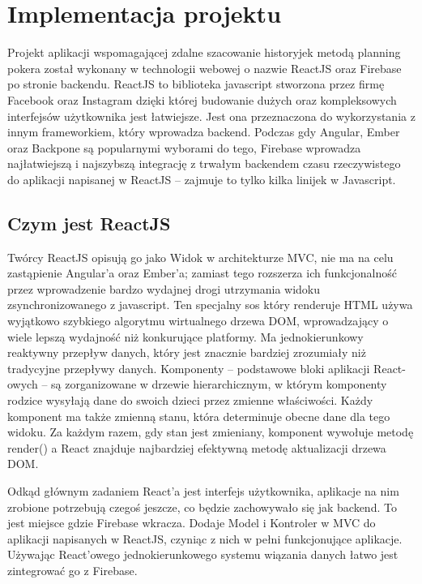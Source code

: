 
\chapter{Implementacja projektu}

Projekt aplikacji wspomagającej zdalne szacowanie historyjek metodą planning pokera został wykonany w technologii webowej o nazwie ReactJS oraz Firebase po stronie backendu. ReactJS to biblioteka javascript stworzona przez firmę Facebook oraz Instagram dzięki której budowanie dużych oraz kompleksowych interfejsów użytkownika jest łatwiejsze. Jest ona przeznaczona do wykorzystania z innym frameworkiem, który wprowadza backend. Podczas gdy Angular, Ember oraz Backpone są popularnymi wyborami do tego, Firebase wprowadza najłatwiejszą i najszybszą integrację z trwałym backendem czasu rzeczywistego do aplikacji napisanej w ReactJS – zajmuje to tylko kilka linijek w Javascript. 

\section{Czym jest ReactJS}

Twórcy ReactJS opisują go jako Widok w architekturze MVC, nie ma na celu zastąpienie Angular’a oraz Ember’a; zamiast tego rozszerza ich funkcjonalność przez wprowadzenie bardzo wydajnej drogi utrzymania widoku zsynchronizowanego z javascript. Ten specjalny sos który renderuje HTML używa wyjątkowo szybkiego algorytmu wirtualnego drzewa DOM, wprowadzający o wiele lepszą wydajność niż konkurujące platformy. Ma jednokierunkowy reaktywny przepływ danych, który jest znacznie bardziej zrozumiały niż tradycyjne przepływy danych. Komponenty – podstawowe bloki aplikacji React-owych – są zorganizowane w drzewie hierarchicznym, w którym komponenty rodzice wysyłają dane do swoich dzieci przez zmienne właściwości. Każdy komponent ma także zmienną stanu, która determinuje obecne dane dla tego widoku. Za każdym razem, gdy stan jest zmieniany, komponent wywołuje metodę render() a React znajduje najbardziej efektywną metodę aktualizacji drzewa DOM.

Odkąd głównym zadaniem React’a jest interfejs użytkownika, aplikacje na nim zrobione potrzebują czegoś jeszcze, co będzie zachowywało się jak backend. To jest miejsce gdzie Firebase wkracza. Dodaje Model i Kontroler w MVC do aplikacji napisanych w ReactJS, czyniąc z nich w pełni funkcjonujące aplikacje. Używając React’owego jednokierunkowego systemu wiązania danych łatwo jest zintegrować go z Firebase.\cite{www_react}

